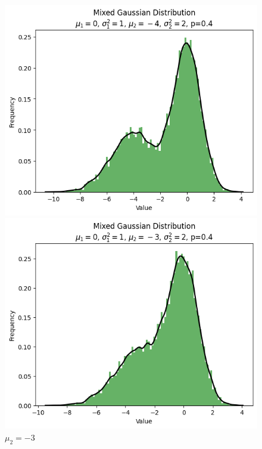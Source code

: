 \documentclass{article}
\begin{document}
\begin{figure}[H]
\begin{minipage}[b]{0.2\linewidth}
        \caption{$\mu_2=-5$}
    \end{minipage}
    \hfill
    \begin{minipage}[b]{0.2\linewidth}
        \centering
        \includegraphics[width=\linewidth]{figure/mu_2=-4.png}
        \caption{$\mu_2=-4$}
    \end{minipage}
    \hfill
    \begin{minipage}[b]{0.2\linewidth}
        \centering
        \includegraphics[width=\linewidth]{figure/mu_2=-3.png}
        \caption{$\mu_2=-3$}

\end{minipage}
\end{figure}
\end{document}
